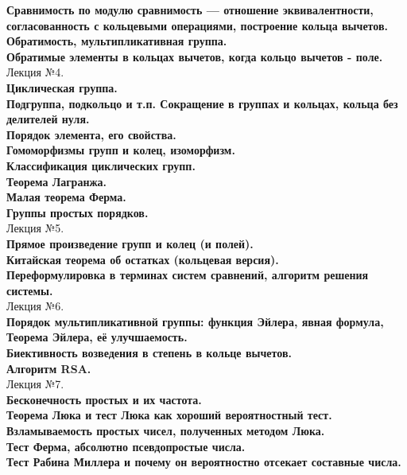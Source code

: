 \documentclass[12pt]{article}
\begin{document}
\textbf{Сравнимость по модулю сравнимость — отношение эквивалентности, согласованность с кольцевыми операциями, построение кольца вычетов.}\\

\textbf{Обратимость, мультипликативная группа.}\\

\textbf{Обратимые элементы в кольцах вычетов, когда кольцо вычетов - поле.}\\

Лекция №4.\\
\textbf{Циклическая группа.}\\

\textbf{Подгруппа, подкольцо и т.п. Сокращение в группах и кольцах, кольца без делителей нуля.}\\

\textbf{Порядок элемента, его свойства.}\\

\textbf{Гомоморфизмы групп и колец, изоморфизм.}\\

\textbf{Классификация циклических групп.}\\

\textbf{Теорема Лагранжа.}\\

\textbf{Малая теорема Ферма.}\\

\textbf{Группы простых порядков.}\\

Лекция №5.\\
\textbf{Прямое произведение групп и колец (и полей).}\\

\textbf{Китайская теорема об остатках (кольцевая версия).}\\

\textbf{Переформулировка в терминах систем сравнений, алгоритм решения системы.}\\

Лекция №6.\\
\textbf{Порядок мультипликативной группы: функция Эйлера, явная формула, Теорема Эйлера, её улучшаемость.}\\

\textbf{Биективность возведения в степень в кольце вычетов.}\\

\textbf{Алгоритм RSA.}\\

Лекция №7.\\
\textbf{Бесконечность простых и их частота.}\\

\textbf{Теорема Люка и тест Люка как хороший вероятностный тест.}\\

\textbf{Взламываемость простых чисел, полученных методом Люка.}\\

\textbf{Тест Ферма, абсолютно псевдопростые числа.}\\

\textbf{Тест Рабина Миллера и почему он вероятностно отсекает составные числа.}\\
\end{document}
